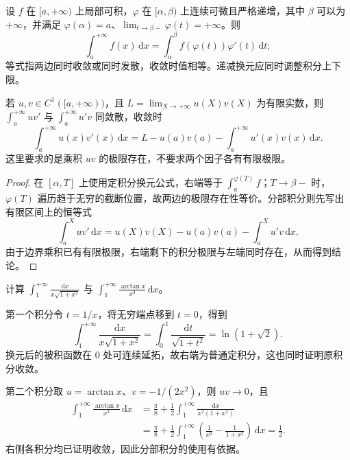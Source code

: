 \documentclass[UTF8,12pt,a4paper,fontset=fandol]{ctexbook}
\begin{document}
\begin{proposition}[换元与分部积分]
\label{prop:improper-substitution-and-parts}
设 $f$ 在 $[a,+\infty)$ 上局部可积，$\varphi$ 在 $[\alpha,\beta)$ 上连续可微且严格递增，其中 $\beta$ 可以为 $+\infty$，并满足 $\varphi(\alpha)=a$、$\lim_{t\to\beta-}\varphi(t)=+\infty$。则
\begin{equation}
    \int_a^{+\infty}f(x)\,\mathrm{d}x
    =\int_\alpha^\beta f(\varphi(t))\varphi'(t)\,\mathrm{d}t;
    \label{eq:improper-substitution}
\end{equation}
等式指两边同时收敛或同时发散，收敛时值相等。递减换元应同时调整积分上下限。

若 $u,v\in C^1([a,+\infty))$，且 $L=\lim_{X\to+\infty}u(X)v(X)$ 为有限实数，则 $\int_a^{+\infty}uv'$ 与 $\int_a^{+\infty}u'v$ 同敛散，收敛时
\begin{equation}
    \int_a^{+\infty}u(x)v'(x)\,\mathrm{d}x
    =L-u(a)v(a)-\int_a^{+\infty}u'(x)v(x)\,\mathrm{d}x.
    \label{eq:improper-integration-by-parts}
\end{equation}
这里要求的是乘积 $uv$ 的极限存在，不要求两个因子各有有限极限。
\end{proposition}

\begin{proof}
在 $[\alpha,T]$ 上使用定积分换元公式，右端等于 $\int_a^{\varphi(T)}f$；$T\to\beta-$ 时，$\varphi(T)$ 遍历趋于无穷的截断位置，故两边的极限存在性等价。分部积分则先写出有限区间上的恒等式
\[
    \int_a^X uv'\,\mathrm{d}x
    =u(X)v(X)-u(a)v(a)-\int_a^X u'v\,\mathrm{d}x.
\]
由于边界乘积已有有限极限，右端剩下的积分极限与左端同时存在，从而得到结论。
\end{proof}

\begin{example}
\label{ex:improper-substitution-and-parts-computations}
计算 $\int_1^{+\infty}\frac{\mathrm{d}x}{x\sqrt{1+x^2}}$ 与 $\int_1^{+\infty}\frac{\arctan x}{x^3}\,\mathrm{d}x$。
\end{example}

\begin{solve}
第一个积分令 $t=1/x$，将无穷端点移到 $t=0$，得到
\[
    \int_1^{+\infty}\frac{\mathrm{d}x}{x\sqrt{1+x^2}}
    =\int_0^1\frac{\mathrm{d}t}{\sqrt{1+t^2}}
    =\ln(1+\sqrt2).
\]
换元后的被积函数在 $0$ 处可连续延拓，故右端为普通定积分，这也同时证明原积分收敛。

第二个积分取 $u=\arctan x$、$v=-1/(2x^2)$，则 $uv\to0$，且
\begin{align*}
    \int_1^{+\infty}\frac{\arctan x}{x^3}\,\mathrm{d}x
    &=\frac\pi8+\frac12\int_1^{+\infty}
        \frac{\mathrm{d}x}{x^2(1+x^2)}\\
    &=\frac\pi8+\frac12\int_1^{+\infty}
        \left(\frac1{x^2}-\frac1{1+x^2}\right)\,\mathrm{d}x
      =\frac12.
\end{align*}
右侧各积分均已证明收敛，因此分部积分的使用有依据。
\end{solve}
\end{document}
